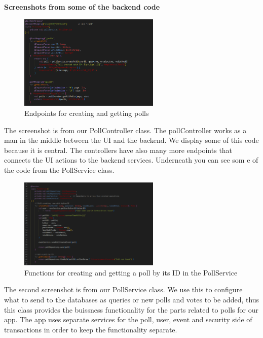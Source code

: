 \noindent \textbf{Screenshots from some of the backend code}

\begin{figure}[H]
	\centering
	\includegraphics[width=0.6\textwidth]{../images/pollController.png}
	\caption{Endpoints for creating and getting polls}
	\label{fig:pollController}
\end{figure}

\noindent The screenshot is from our PollController class. The pollController works as a man in the middle between the UI and the backend. We display some of this code because it is central. The controllers have also many more endpoints that connects the UI actions to the backend services. Underneath you can see som e of the code from the PollService class.

\begin{figure}[H]
	\centering
	\includegraphics[width=0.6\textwidth]{../images/pollService.png}
	\caption{Functions for creating and getting a poll by its ID in the PollService}
	\label{fig:pollService}
\end{figure}

\noindent The second screenshot is from our PollService class. We use this to configure what to send to the databases as queries or new polls and votes to be added, thus this class provides the buissness functionality for the parts related to polls for our app. The app uses separate services for the poll, user, event and security side of transactions in order to keep the functionality separate.

